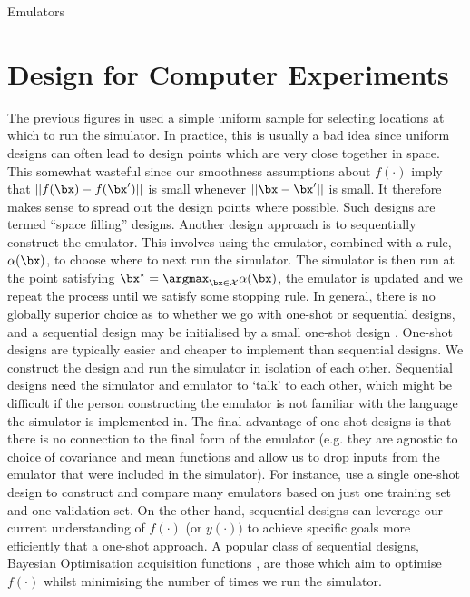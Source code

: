 \begin{chapter}{Emulators \label{Ch:Emulators}}
\section{Design for Computer Experiments}
The previous figures in used a simple uniform sample for selecting locations at which to run the simulator. In practice, this is usually a bad idea since uniform designs can often lead to design points which are very close together in space. This somewhat wasteful since our smoothness assumptions about $f(\cdot)$ imply that $||f(\bx) - f(\bx')||$ is small whenever $||\bx - \bx'||$ is small. It therefore makes sense to spread out the design points where possible. Such designs are termed ``space filling'' designs.
Another design approach is to sequentially construct the emulator. This involves using the emulator, combined with a rule, $\alpha(\bx)$, to choose where to next run the simulator. The simulator is then run at the point satisfying $\bx^\star = \argmax_{\bx \in \mathcal{X}} \alpha(\bx)$, the emulator is updated and we repeat the process until we satisfy some stopping rule.
In general, there is no globally superior choice as to whether we go with one-shot or sequential designs, and a sequential design may be initialised by a small one-shot design \citep{Zhang2019}. One-shot designs are typically easier and cheaper to implement than sequential designs. We construct the design and run the simulator in isolation of each other. Sequential designs need the simulator and emulator to `talk' to each other, which might be difficult if the person constructing the emulator is not familiar with the language the simulator is implemented in. The final advantage of one-shot designs is that there is no connection to the final form of the emulator (e.g. they are agnostic to choice of covariance and mean functions and allow us to drop inputs from the emulator that were included in the simulator). For instance, \citet{Overstall2017} use a single one-shot design to construct and compare many emulators based on just one training set and one validation set. On the other hand, sequential designs can leverage our current understanding of $f(\cdot)$ (or $y(\cdot))$ to achieve specific goals more efficiently that a one-shot approach. A popular class of sequential designs, Bayesian Optimisation acquisition functions \citep{Frazier2018}, are those which aim to optimise $f(\cdot)$ whilst minimising the number of times we run the simulator.

\end{chapter}
